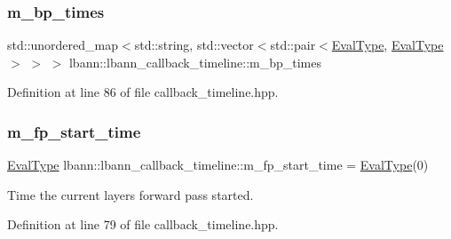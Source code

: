\subsubsection{\texorpdfstring{m\+\_\+bp\+\_\+times}{m\_bp\_times}}
{\footnotesize\ttfamily std\+::unordered\+\_\+map$<$std\+::string, std\+::vector$<$std\+::pair$<$\hyperlink{base_8hpp_a3266f5ac18504bbadea983c109566867}{Eval\+Type}, \hyperlink{base_8hpp_a3266f5ac18504bbadea983c109566867}{Eval\+Type}$>$ $>$ $>$ lbann\+::lbann\+\_\+callback\+\_\+timeline\+::m\+\_\+bp\+\_\+times\hspace{0.3cm}{\ttfamily [private]}}



Definition at line 86 of file callback\+\_\+timeline.\+hpp.

\mbox{\label{classlbann_1_1lbann__callback__timeline_a5c24aa919edfcd34fce577ef17e9153f}} 
\subsubsection{\texorpdfstring{m\+\_\+fp\+\_\+start\+\_\+time}{m\_fp\_start\_time}}
{\footnotesize\ttfamily \hyperlink{base_8hpp_a3266f5ac18504bbadea983c109566867}{Eval\+Type} lbann\+::lbann\+\_\+callback\+\_\+timeline\+::m\+\_\+fp\+\_\+start\+\_\+time = \hyperlink{base_8hpp_a3266f5ac18504bbadea983c109566867}{Eval\+Type}(0)\hspace{0.3cm}{\ttfamily [private]}}



Time the current layer\textquotesingle{}s forward pass started. 



Definition at line 79 of file callback\+\_\+timeline.\+hpp.

\mbox{\label{classlbann_1_1lbann__callback__timeline_ab43061b16cd5d29045be1d9294a80ef1}} 
